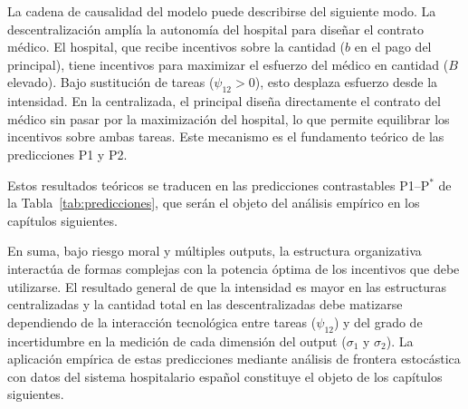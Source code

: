 \begin{remark}
La cadena de causalidad del modelo puede describirse del siguiente modo. La descentralización amplía la autonomía del hospital para diseñar el contrato médico. El hospital, que recibe incentivos sobre la cantidad ($b$ en el pago del principal), tiene incentivos para maximizar el esfuerzo del médico en cantidad ($B$ elevado). Bajo sustitución de tareas ($\psi_{12}>0$), esto desplaza esfuerzo desde la intensidad. En la centralizada, el principal diseña directamente el contrato del médico sin pasar por la maximización del hospital, lo que permite equilibrar los incentivos sobre ambas tareas. Este mecanismo es el fundamento teórico de las predicciones P1 y P2.
\end{remark}

Estos resultados teóricos se traducen en las predicciones contrastables P1--P$^*$ de la Tabla~\ref{tab:predicciones}, que serán el objeto del análisis empírico en los capítulos siguientes.

En suma, bajo riesgo moral y múltiples outputs, la estructura organizativa interactúa de formas complejas con la potencia óptima de los incentivos que debe utilizarse. El resultado general de que la intensidad es mayor en las estructuras centralizadas y la cantidad total en las descentralizadas debe matizarse dependiendo de la interacción tecnológica entre tareas ($\psi_{12}$) y del grado de incertidumbre en la medición de cada dimensión del output ($\sigma_1$ y $\sigma_2$). La aplicación empírica de estas predicciones mediante análisis de frontera estocástica con datos del sistema hospitalario español constituye el objeto de los capítulos siguientes.



